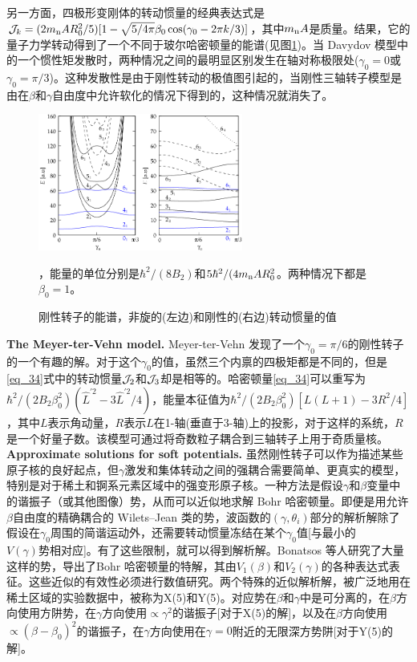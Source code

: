 另一方面，四极形变刚体的转动惯量的经典表达式是${\cal J}_k=(2m_{\rm n}AR_0^2/5)[1-\sqrt{5/4\pi}\beta_0\cos(\gamma_0-2\pi k/3)]$，其中$m_{\rm n}A$是质量。结果，它的量子力学转动得到了一个不同于玻尔哈密顿量的能谱(见图\ref{F_davydov})。当 Davydov 模型中的一个惯性矩发散时，两种情况之间的最明显区别发生在轴对称极限处($\gamma_0=0$或$\gamma_0=\pi/3$)。这种发散性是由于刚性转动的极值图引起的，当刚性三轴转子模型是由在$\beta$和$\gamma$自由度中允许软化的情况下得到的，这种情况就消失了。
\begin{figure}[H]
\centering
\includegraphics[width=0.6\textwidth]{figure/F_davydov.png}
\caption{刚性转子的能谱，非旋的(左边)和刚性的(右边)转动惯量的值\label{F_davydov}}，能量的单位分别是$\hbar^2/(8B_2)$和$5\hbar^2/(4m_{\rm n}AR_0^2$。两种情况下都是$\beta_0=1$。
\end{figure}
\vskip 0.6cm
\noindent\textbf{\large The Meyer-ter-Vehn model.}
\vskip 0.3cm
Meyer-ter-Vehn 发现了一个$\gamma_0=\pi/6$的刚性转子的一个有趣的解。对于这个$\gamma_0$的值，虽然三个内禀的四极矩都是不同的，但是\ref{eq_34}式中的转动惯量${\cal J}_2$和${\cal J}_3$却是相等的。哈密顿量\ref{eq_34}可以重写为$\hbar^2/(2B_2\beta_0^2)(\hat{L}^{\prime2}-3\hat{L}^{\prime2}/4)$，能量本征值为$\hbar^2/(2B_2\beta_0^2)[L(L+1)-3R^2/4]$，其中$L$表示角动量，$R$表示$L$在1-轴(垂直于3-轴)上的投影，对于这样的系统，$R$是一个好量子数。该模型可通过将奇数粒子耦合到三轴转子上用于奇质量核。
\vskip 0.6cm
\noindent\textbf{\large Approximate solutions for soft potentials.}
\vskip 0.3cm
虽然刚性转子可以作为描述某些原子核的良好起点，但$\gamma$激发和集体转动之间的强耦合需要简单、更真实的模型，特别是对于稀土和锕系元素区域中的强变形原子核。一种方法是假设$\gamma$和$\beta$变量中的谐振子（或其他图像）势，从而可以近似地求解 Bohr 哈密顿量。即便是用允许$\beta$自由度的精确耦合的 Wilets–Jean 类的势，波函数的$(\gamma,\theta_i)$部分的解析解除了假设在$\gamma_0$周围的简谐运动外，还需要转动惯量冻结在某个$\gamma_0$值[与最小的$V(\gamma)势相对应$]。有了这些限制，就可以得到解析解。Bonatsos 等人研究了大量这样的势，导出了Bohr 哈密顿量的特解，其由$V_1(\beta)$和$V_2(\gamma)$的各种表达式表征。这些近似的有效性必须进行数值研究。两个特殊的近似解析解，被广泛地用在稀土区域的实验数据中，被称为X(5)和Y(5)。对应势在$\beta$和$\gamma$中是可分离的，在$\beta$方向使用方阱势，在$\gamma$方向使用$\propto\gamma^2$的谐振子[对于X(5)的解]，以及在$\beta$方向使用$\propto(\beta-\beta_0)^2$的谐振子，在$\gamma$方向使用在$\gamma=0$附近的无限深方势阱[对于Y(5)的解]。

